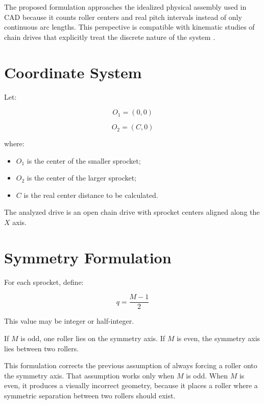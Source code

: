 \documentclass[12pt,a4paper]{article}
\begin{document}
The proposed formulation approaches the idealized physical assembly used in CAD because it counts roller centers and real pitch intervals instead of only continuous arc lengths. This perspective is compatible with kinematic studies of chain drives that explicitly treat the discrete nature of the system \cite{fuglede2016mmt,fuglede2016jsv}.

\section{Coordinate System}

Let:

\begin{equation}
O_1=(0,0)
\end{equation}

\begin{equation}
O_2=(C,0)
\end{equation}

where:

\begin{itemize}
    \item $O_1$ is the center of the smaller sprocket;
    \item $O_2$ is the center of the larger sprocket;
    \item $C$ is the real center distance to be calculated.
\end{itemize}

The analyzed drive is an open chain drive with sprocket centers aligned along the $X$ axis.

\section{Symmetry Formulation}

For each sprocket, define:

\begin{equation}
q=\frac{M-1}{2}
\end{equation}

This value may be integer or half-integer.

If $M$ is odd, one roller lies on the symmetry axis. If $M$ is even, the symmetry axis lies between two rollers.

This formulation corrects the previous assumption of always forcing a roller onto the symmetry axis. That assumption works only when $M$ is odd. When $M$ is even, it produces a visually incorrect geometry, because it places a roller where a symmetric separation between two rollers should exist.
\end{document}
